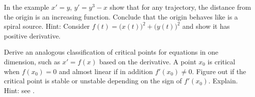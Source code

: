 \begin{exercise} \label{exercise:increasing}
In the example $x'=y$, $y'=y^3-x$ show that for any trajectory, the distance
from the origin is an increasing function.
Conclude
that the origin behaves like is a spiral source.
Hint: Consider $f(t) =
{\bigl(x(t)\bigr)}^2 + 
{\bigl(y(t)\bigr)}^2$ and show it has positive derivative.
\end{exercise}

\begin{exercise}\ansMark%
Derive an analogous classification of critical points for equations in one dimension,
such as $x'= f(x)$ based on the derivative.  A point $x_0$ is critical when $f(x_0) = 0$ and
almost linear if in addition $f'(x_0) \not= 0$.  Figure out if the critical point is stable or unstable
depending on the sign of $f'(x_0)$.  Explain.  Hint: see .
\end{exercise}


\setcounter{exercise}{100}
